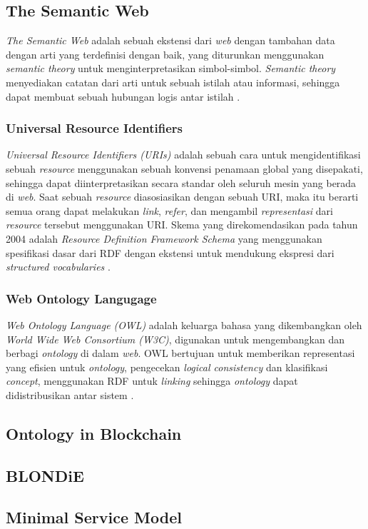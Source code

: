 \subsection{The Semantic Web}
\label{subsec:the-semantic-web}

\textit{The Semantic Web} adalah sebuah ekstensi dari \textit{web} dengan tambahan data dengan arti yang terdefinisi dengan baik, yang diturunkan menggunakan \textit{semantic theory} untuk menginterpretasikan simbol-simbol. \textit{Semantic theory} menyediakan catatan dari arti untuk sebuah istilah atau informasi, sehingga dapat membuat sebuah hubungan logis antar istilah \parencite{shadbolt2006semantic}.

\subsubsection{Universal Resource Identifiers}
\label{subsubsec:universal-resource-identifiers}

\textit{Universal Resource Identifiers (URIs)} adalah sebuah cara untuk mengidentifikasi sebuah \textit{resource} menggunakan sebuah konvensi penamaan global yang disepakati, sehingga dapat diinterpretasikan secara standar oleh seluruh mesin yang berada di \textit{web}. Saat sebuah \textit{resource} diasosiasikan dengan sebuah URI, maka itu berarti semua orang dapat melakukan \textit{link}, \textit{refer}, dan mengambil \textit{representasi} dari \textit{resource} tersebut menggunakan URI. Skema yang direkomendasikan pada tahun 2004 adalah \textit{Resource Definition Framework Schema} yang menggunakan spesifikasi dasar dari RDF dengan ekstensi untuk mendukung ekspresi dari \textit{structured vocabularies} \parencite{shadbolt2006semantic}.

\subsubsection{Web Ontology Langugage}
\label{subsubsec:web-ontology-language}

\textit{Web Ontology Language (OWL)} adalah keluarga bahasa yang dikembangkan oleh \textit{World Wide Web Consortium (W3C)}, digunakan untuk mengembangkan dan berbagi \textit{ontology} di dalam \textit{web}. OWL bertujuan untuk memberikan representasi yang efisien untuk \textit{ontology}, pengecekan \textit{logical consistency} dan klasifikasi \textit{concept}, menggunakan RDF untuk \textit{linking} sehingga \textit{ontology} dapat didistribusikan antar sistem \parencite{shadbolt2006semantic}.

\subsection{Ontology in Blockchain}
\label{subsec:ontology-in-blockchain}

\subsection{BLONDiE}
\label{subsec:blondie}

\subsection{Minimal Service Model}
\label{subsec:minimal-service-model}